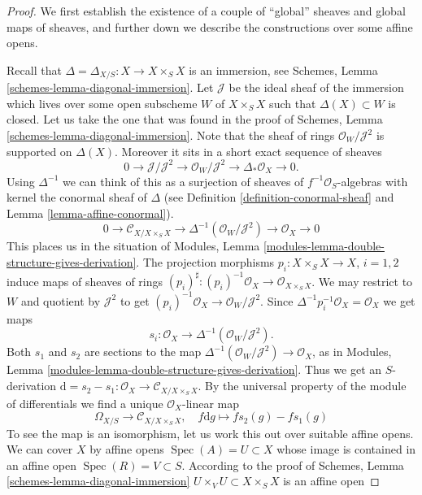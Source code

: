\documentclass[10pt,a4paper]{amsart}
\theoremstyle{plain}
\theoremstyle{definition}
\theoremstyle{remark}
\numberwithin{equation}{subsection}
\def\Spec{\mathop{\mathrm{Spec}}}
\begin{document}
\begin{proof}
We first establish the existence of a couple of ``global'' sheaves
and global maps of sheaves, and further down we describe
the constructions over some affine opens.

\medskip\noindent
Recall that $\Delta = \Delta_{X/S} : X \to X \times_S X$
is an immersion, see Schemes, Lemma \ref{schemes-lemma-diagonal-immersion}.
Let $\mathcal{J}$ be the ideal sheaf of the immersion
which lives over some open subscheme $W$ of $X \times_S X$
such that $\Delta(X) \subset W$ is closed. Let us take the one that
was found in the proof of
Schemes, Lemma \ref{schemes-lemma-diagonal-immersion}.
Note that the sheaf of rings $\mathcal{O}_W/\mathcal{J}^2$
is supported on $\Delta(X)$. Moreover it sits in a
short exact sequence of sheaves
$$
0 \to \mathcal{J}/\mathcal{J}^2
\to \mathcal{O}_W/\mathcal{J}^2
\to \Delta_*\mathcal{O}_X
\to 0.
$$
Using $\Delta^{-1}$ we can think of this as a surjection of
sheaves of $f^{-1}\mathcal{O}_S$-algebras with kernel the
conormal sheaf of $\Delta$ (see Definition \ref{definition-conormal-sheaf}
and Lemma \ref{lemma-affine-conormal}).
$$
0 \to \mathcal{C}_{X/X \times_S X}
\to \Delta^{-1}(\mathcal{O}_W/\mathcal{J}^2)
\to \mathcal{O}_X
\to 0
$$
This places us in the situation of
Modules, Lemma \ref{modules-lemma-double-structure-gives-derivation}.
The projection morphisms $p_i : X \times_S X \to X$, $i = 1, 2$ induce
maps of sheaves of rings
$(p_i)^\sharp : (p_i)^{-1}\mathcal{O}_X \to \mathcal{O}_{X \times_S X}$.
We may restrict to $W$ and quotient by $\mathcal{J}^2$ to get
$(p_i)^{-1}\mathcal{O}_X \to \mathcal{O}_W/\mathcal{J}^2$.
Since $\Delta^{-1}p_i^{-1}\mathcal{O}_X = \mathcal{O}_X$
we get maps
$$
s_i : \mathcal{O}_X \to \Delta^{-1}(\mathcal{O}_W/\mathcal{J}^2).
$$
Both $s_1$ and $s_2$ are sections to the map
$\Delta^{-1}(\mathcal{O}_W/\mathcal{J}^2) \to \mathcal{O}_X$,
as in Modules, Lemma \ref{modules-lemma-double-structure-gives-derivation}.
Thus we get an $S$-derivation
$\text{d} = s_2 - s_1 : \mathcal{O}_X \to \mathcal{C}_{X/X \times_S X}$.
By the universal property of the module of differentials we find a
unique $\mathcal{O}_X$-linear map
$$
\Omega_{X/S} \longrightarrow \mathcal{C}_{X/X \times_S X},\quad
f\text{d}g \longmapsto fs_2(g) - fs_1(g)
$$
To see the map is an isomorphism, let us work this out over suitable affine
opens. We can cover $X$ by affine opens $\Spec(A) = U \subset X$
whose image is contained in an affine open $\Spec(R) = V \subset S$.
According to the proof of Schemes, Lemma \ref{schemes-lemma-diagonal-immersion}
$U \times_V U \subset X \times_S X$ is an affine open

\end{proof}
\end{document}
